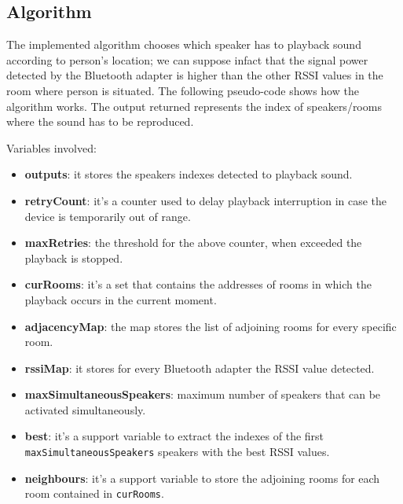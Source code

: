 \documentclass[conference]{IEEEtran}
\begin{document}
\subsection{Algorithm}
The implemented algorithm chooses which speaker has to playback sound according to person's location; we can suppose infact that the signal power detected by the Bluetooth adapter is higher than the other RSSI values in the room where person is situated. The following pseudo-code shows how the algorithm works. The output returned represents the index of speakers/rooms where the sound has to be reproduced.

Variables involved:
\begin{itemize}
\item \textbf{outputs}: it stores the speakers indexes detected to playback sound. 
\item \textbf{retryCount}: it's a counter used to delay playback interruption in case the device is temporarily out of range.
\item \textbf{maxRetries}: the threshold for the above counter, when exceeded the playback is stopped.
\item \textbf{curRooms}: it's a set that contains the addresses of rooms in which the playback occurs in the current moment.
\item \textbf{adjacencyMap}: the map stores the list of adjoining rooms for every specific room.
\item \textbf{rssiMap}: it stores for every Bluetooth adapter the RSSI value detected.
\item \textbf{maxSimultaneousSpeakers}: maximum number of speakers that can be activated simultaneously.
\item \textbf{best}: it's a support variable to extract the indexes of the first \texttt{maxSimultaneousSpeakers} speakers with the best RSSI values. 
\item \textbf{neighbours}: it's a support variable to store the adjoining rooms for each room contained in \texttt{curRooms}.
\end{itemize}
\end{document}
